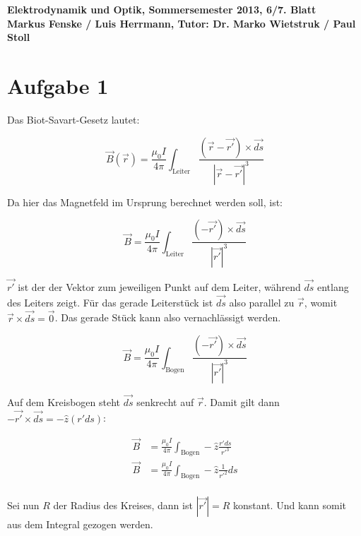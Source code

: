 \documentclass[a4paper,german,12pt,smallheadings]{scrartcl}
\begin{document}
\begin{center}
\bfseries %
\sffamily %
\vspace{-40pt}
Elektrodynamik und Optik, Sommersemester 2013, 6/7. Blatt \\
Markus Fenske / Luis Herrmann, Tutor: Dr. Marko Wietstruk / Paul Stoll
\vspace{-10pt}
\end{center}
\section*{Aufgabe 1}
Das Biot-Savart-Gesetz lautet:

\begin{equation*}
  \vec{B}(\vec{r}) = \frac{\mu_0 I}{4 \pi} \int_{\text{Leiter}} \frac{(\vec{r} - \vec{r'}) \times \vec{ds}}{|\vec{r}-\vec{r'}|^3}
\end{equation*}

Da hier das Magnetfeld im Ursprung berechnet werden soll, ist:


\begin{equation*}
  \vec{B} = \frac{\mu_0 I}{4 \pi} \int_{\text{Leiter}} \frac{(-\vec{r'}) \times \vec{ds}}{|\vec{r'}|^3}
\end{equation*}

$\vec{r'}$ ist der der Vektor zum jeweiligen Punkt auf dem Leiter, während
$\vec{ds}$ entlang des Leiters zeigt. Für das gerade Leiterstück ist $\vec{ds}$
also parallel zu $\vec{r}$, womit $\vec{r} \times \vec{ds} = \vec{0}$. Das
gerade Stück kann also vernachlässigt werden.

\begin{equation*}
  \vec{B} = \frac{\mu_0 I}{4 \pi} \int_{\text{Bogen}} \frac{(-\vec{r'}) \times \vec{ds}}{|\vec{r'}|^3}
\end{equation*}

Auf dem Kreisbogen steht $\vec{ds}$ senkrecht auf $\vec{r}$. Damit gilt dann
$-\vec{r'} \times \vec{ds} = -\widehat{z} (r' ds)$:

\begin{align*}
  \vec{B} &= \frac{\mu_0 I}{4 \pi} \int_{\text{Bogen}} -\widehat{z} \frac{r' ds}{r'^3} \\
  \vec{B} &= \frac{\mu_0 I}{4 \pi} \int_{\text{Bogen}} -\widehat{z} \frac{1}{r'^2} ds \\
\end{align*}

Sei nun $R$ der Radius des Kreises, dann ist $|\vec{r'}| = R$ konstant. Und
kann somit aus dem Integral gezogen werden.
\end{document}
